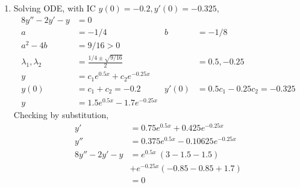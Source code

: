 \begin{enumerate}
    \item Solving ODE, with IC $ y(0) = -0.2, y'(0) = -0.325 $,
          \begin{align}
              8y'' - 2y' - y           & = 0                                 \\
              a                        & = -1/4                            &
              b                        & = -1/8                              \\
              a^{2} - 4b               & = 9/16 > 0                          \\
              \lambda_{1}, \lambda_{2} & = \frac{1/4 \pm \sqrt{9/16}}{2}   &
                                       & = 0.5, -0.25                        \\
              y                        & = c_{1}e^{0.5x} + c_{2}e^{-0.25x}   \\
              y(0)                     & = c_{1} + c_{2} = -0.2            &
              y'(0)                    & = 0.5c_{1} - 0.25c_{2} = -0.325     \\
              y                        & = 1.5e^{0.5x} - 1.7e^{-0.25x}
          \end{align}
          Checking by substitution,
          \begin{align}
              y'             & = 0.75e^{0.5x} + 0.425e^{-0.25x}    \\
              y''            & =  0.375e^{0.5x} -0.10625e^{-0.25x} \\
              8y'' - 2y' - y & = e^{0.5x}\ (3  - 1.5 - 1.5)        \\
                             & + e^{-0.25x}(-0.85 - 0.85 + 1.7)    \\
                             & = 0
          \end{align}


\end{enumerate}
